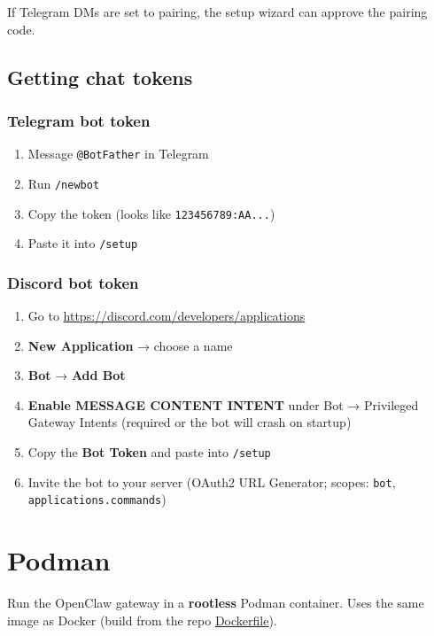 If Telegram DMs are set to pairing, the setup wizard can approve the pairing code.

\subsection{Getting chat tokens}


\subsubsection{Telegram bot token}


\begin{enumerate}
  \item Message \texttt{@BotFather} in Telegram
  \item Run \texttt{/newbot}
  \item Copy the token (looks like \texttt{123456789:AA...})
  \item Paste it into \texttt{/setup}
\end{enumerate}


\subsubsection{Discord bot token}


\begin{enumerate}
  \item Go to \href{https://discord.com/developers/applications}{https://discord.com/developers/applications}
  \item \textbf{New Application} → choose a name
  \item \textbf{Bot} → \textbf{Add Bot}
  \item \textbf{Enable MESSAGE CONTENT INTENT} under Bot → Privileged Gateway Intents (required or the bot will crash on startup)
  \item Copy the \textbf{Bot Token} and paste into \texttt{/setup}
  \item Invite the bot to your server (OAuth2 URL Generator; scopes: \texttt{bot}, \texttt{applications.commands})
\end{enumerate}



\clearpage

\section{Podman}


Run the OpenClaw gateway in a \textbf{rootless} Podman container. Uses the same image as Docker (build from the repo \href{https://github.com/openclaw/openclaw/blob/main/Dockerfile}{Dockerfile}).

